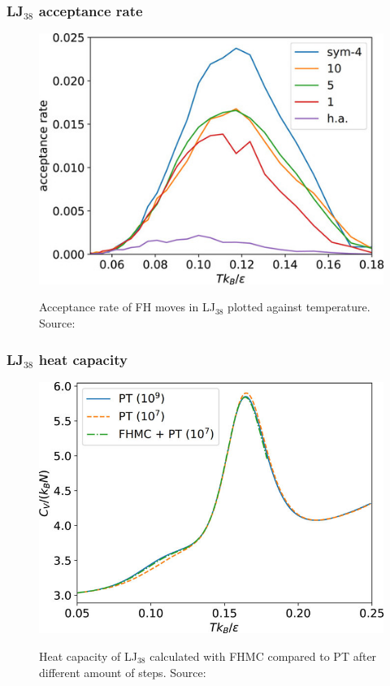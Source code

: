 \documentclass{beamer}
\begin{document}
	\begin{frame}
		\frametitle{LJ$_{38}$ acceptance rate} %
		\begin{figure}
			\center
			\includegraphics[height=0.8\textheight]{figures/LJ38_acc.jpg}
			\label{fig:LJ38_acc}
			\caption{Acceptance rate  of FH moves in LJ$_{38}$ plotted against temperature. Source: \cite{Finkler2020}}
		\end{figure}
	\end{frame}

	\begin{frame}
		\frametitle{LJ$_{38}$ heat capacity} %
		\begin{figure}
			\center
			\includegraphics[height=0.8\textheight]{figures/LJ38_Cv.jpeg}
			\label{fig:LJ38_Cv}
			\caption{Heat capacity of LJ$_{38}$ calculated with FHMC compared to PT after different amount of steps. Source: \cite{Finkler2020}}
		\end{figure}		
	\end{frame}
\end{document}
